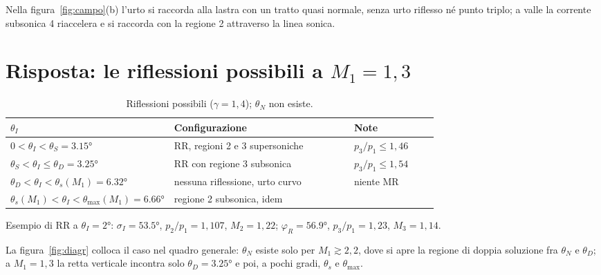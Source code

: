 
Nella figura~\ref{fig:campo}(b) l'urto si raccorda alla lastra con un tratto quasi normale, senza urto riflesso né
punto triplo; a valle la corrente subsonica 4 riaccelera e si raccorda con la regione 2 attraverso la linea sonica.

\section*{Risposta: le riflessioni possibili a $M_1=1{,}3$}
\begin{table}[H]
\centering\small
\begin{tabular}{p{0.3\linewidth}p{0.42\linewidth}l}
\toprule
$\theta_I$ & Configurazione & Note \\
\midrule
$0<\theta_I<\theta_S=\ang{3.15}$ & RR, regioni 2 e 3 supersoniche & $p_3/p_1\le1{,}46$ \\
$\theta_S<\theta_I\le\theta_D=\ang{3.25}$ & RR con regione 3 subsonica & $p_3/p_1\le1{,}54$ \\
$\theta_D<\theta_I<\theta_s(M_1)=\ang{6.32}$ & nessuna riflessione, urto curvo & niente MR \\
$\theta_s(M_1)<\theta_I<\theta_{\max}(M_1)=\ang{6.66}$ & regione 2 subsonica, idem & \\
\bottomrule
\end{tabular}
\caption{Riflessioni possibili ($\gamma=1{,}4$); $\theta_N$ non esiste.}
\end{table}

Esempio di RR a $\theta_I=\ang{2}$: $\sigma_I=\ang{53.5}$, $p_2/p_1=1{,}107$, $M_2=1{,}22$; $\varphi_R=\ang{56.9}$,
$p_3/p_1=1{,}23$, $M_3=1{,}14$.


La figura~\ref{fig:diagr} colloca il caso nel quadro generale: $\theta_N$ esiste solo per $M_1\gtrsim2{,}2$, dove si
apre la regione di doppia soluzione fra $\theta_N$ e $\theta_D$; a $M_1=1{,}3$ la retta verticale incontra solo
$\theta_D=\ang{3.25}$ e poi, a pochi gradi, $\theta_s$ e $\theta_{\max}$.

